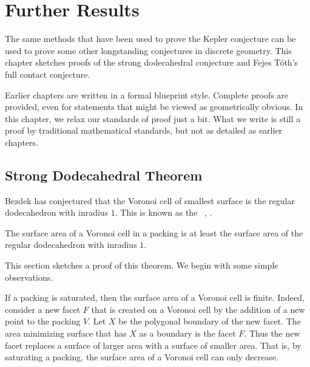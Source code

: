 
\chapter{Further Results}\label{sec:further}


The same methods that have been used to prove the Kepler conjecture
can be used to prove some other longstanding conjectures in discrete
geometry.  This chapter sketches proofs of the strong dodecahedral
conjecture and Fejes T\'oth's full contact conjecture.

Earlier chapters are written in a formal blueprint style.
Complete proofs are provided, even for statements that might be
viewed as geometrically obvious.  In this chapter, we relax our
standards of proof just a bit.  What we write is still a proof by
traditional mathematical standards, but not as detailed as earlier
chapters.

\section{Strong Dodecahedral Theorem}

Bezdek has conjectured that the Voronoi cell of smallest surface is
the regular dodecahedron with inradius $1$.  This is known as the
~\cite{Bezdek00}, \cite{Bezdek05}.  
%
%
%


\begin{theorem}
  The surface area of a Voronoi cell in a packing is at least the
  surface area of the regular dodecahedron with inradius $1$.
\end{theorem}

This section sketches a proof of this theorem.  We
begin with some simple observations.

\begin{remark}
  If a packing is  saturated, then the surface area of a Voronoi
  cell is finite.  
  Indeed, consider a new facet $F$ that is created on a Voronoi cell
  by the addition of a new point to the packing $V$.  Let $X$ be the
  polygonal boundary of the new facet.  The area minimizing surface
  that has $X$ as a boundary is the facet $F$.  Thus the new facet
  replaces a surface of larger area with a surface of smaller area.
  That is, by saturating a packing, the surface area of a Voronoi cell
  can only decrease.
\end{remark}

